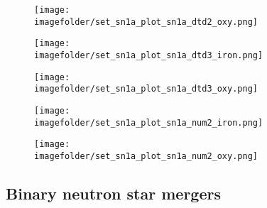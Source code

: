 \begin{figure}[h]
  \centering
  \texttt{[image: \\imagefolder/set\_sn1a\_plot\_sn1a\_dtd2\_oxy.png]}
\end{figure}
\begin{figure}[h]
  \centering
  \texttt{[image: \\imagefolder/set\_sn1a\_plot\_sn1a\_dtd3\_iron.png]}
\end{figure}
\begin{figure}[h]
  \centering
  \texttt{[image: \\imagefolder/set\_sn1a\_plot\_sn1a\_dtd3\_oxy.png]}
\end{figure}
\begin{figure}[h]
  \centering
  \texttt{[image: \\imagefolder/set\_sn1a\_plot\_sn1a\_num2\_iron.png]}
\end{figure}
\begin{figure}[h]
  \centering
  \texttt{[image: \\imagefolder/set\_sn1a\_plot\_sn1a\_num2\_oxy.png]}
\end{figure}

\FloatBarrier
\subsection{Binary neutron star mergers}
\iffalse
Filenames:
set_nsm_plot_combo_rates.png      
set_nsm_plot_combo_spectro.png    
set_nsm_plot_dtd.png              
set_nsm_plot_ejmass.png           
set_nsm_plot_final_rates.png             
set_nsm_plot_final_spectro.png           
set_nsm_plot_mergerfraction_rates.png    
set_nsm_plot_mergerfraction_spectro.png  
set_nsm_plot_nbnsm_rates.png             
set_nsm_plot_nbnsm_spectro.png
\fi


